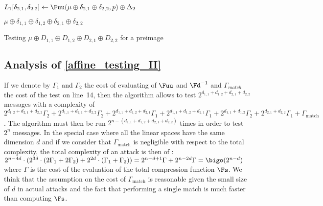 \begin{algorithm}[ht]
        {
          $ L_{1}[\delta_{2,1}, \delta_{2,2}] \leftarrow
          \Fuu(\mu \oplus \delta_{2,1} \oplus \delta_{2,2}, 
          p  ) \oplus \Delta_2$ \;
        }

        { 
          {
            \Return $\mu  \oplus \delta_{1,1} \oplus \delta_{1,2} 
                        \oplus \delta_{2,1} \oplus \delta_{2,2}$ 
          }
        }
        \Return {$\bot$}
        \caption{\label{affine_testing_II} Testing $\mu \oplus D_{1,1} \oplus D_{1,2} \oplus D_{2,1} \oplus D_{2,2}$ for a preimage}

      \end{algorithm}

    \subsection{Analysis of \autoref{affine_testing_II}}
      If we denote by $\Gamma_1$ and $\Gamma_2$ the cost of evaluating
      of $\Fuu$ and $\Fd^{-1}$ and $\Gamma_{match}$ the cost of the test on line~14,
      then the algorithm allows to test
      $2^{d_{1,1}+d_{1,2}+d_{2,1}+d_{2,2}}$ messages with a complexity of 
          $2^{d_{1,2}+d_{2,1}+d_{2,2}} \Gamma_2 + 2^{d_{1,1}+d_{2,1}+d_{2,2}} \Gamma_2 +
          2^{d_{1,1}+d_{1,2}+d_{2,1}} \Gamma_1 +2^{d_{1,1}+d_{1,2}+d_{2,1}} \Gamma_1 +
          2^{d_{1,1}+d_{1,2}} \Gamma_2 + 2^{d_{2,1}+d_{2,2}} \Gamma_1 + \Gamma_{\text{match}}$. 
      The algorithm must then be run $2^{n - (d_{1,1}+d_{1,2}+d_{2,1}+d_{2,2})}$ times in order to test
      $2^n$ messages. 
      In the special case where all the linear spaces have the same 
      dimension $d$ and if we consider that $\Gamma_{\text{match}}$ is negligible
      with respect to the total complexity, the total complexity of an attack is
      then of : 
      $2^{n-4d}\cdot(2^{3d}\cdot(2\Gamma_1+2\Gamma_2)+2^{2d}\cdot(\Gamma_1+\Gamma_2)) = 
      2^{n-d+1} \Gamma + 2^{n-2d} \Gamma = \bigo(2^{n-d})$ where $\Gamma$ is the cost of the 
      evaluation of the total compression function $\Fs$. We think that the assumption on
      the cost of $\Gamma_\text{match}$ is
      reasonable given the small size of $d$ in actual attacks and the fact that performing
      a single match is much faster than computing $\Fs$.

